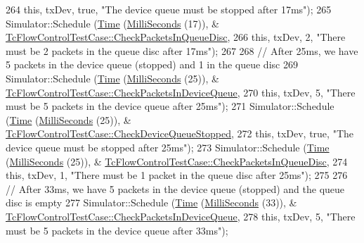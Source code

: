 \begin{DoxyCode}
264                           \textcolor{keyword}{this}, txDev, \textcolor{keyword}{true}, \textcolor{stringliteral}{"The device queue must be stopped after 17ms"});
265       Simulator::Schedule (\hyperlink{classns3_1_1Time}{Time} (\hyperlink{group__timecivil_gaf26127cf4571146b83a92ee18679c7a9}{MilliSeconds} (17)), &
      \hyperlink{classTcFlowControlTestCase_ac6d0b6a74dd29a21369bf1d26795098d}{TcFlowControlTestCase::CheckPacketsInQueueDisc},
266                           \textcolor{keyword}{this}, txDev, 2, \textcolor{stringliteral}{"There must be 2 packets in the queue disc after 17ms"});
267 
268       \textcolor{comment}{// After 25ms, we have 5 packets in the device queue (stopped) and 1 in the queue disc}
269       Simulator::Schedule (\hyperlink{classns3_1_1Time}{Time} (\hyperlink{group__timecivil_gaf26127cf4571146b83a92ee18679c7a9}{MilliSeconds} (25)), &
      \hyperlink{classTcFlowControlTestCase_a7ad467b39fdb155daea4b048619f6d12}{TcFlowControlTestCase::CheckPacketsInDeviceQueue},
270                           \textcolor{keyword}{this}, txDev, 5, \textcolor{stringliteral}{"There must be 5 packets in the device queue after 25ms"});
271       Simulator::Schedule (\hyperlink{classns3_1_1Time}{Time} (\hyperlink{group__timecivil_gaf26127cf4571146b83a92ee18679c7a9}{MilliSeconds} (25)), &
      \hyperlink{classTcFlowControlTestCase_a4ccc9564c9142984fa8041f67b4a518a}{TcFlowControlTestCase::CheckDeviceQueueStopped},
272                           \textcolor{keyword}{this}, txDev, \textcolor{keyword}{true}, \textcolor{stringliteral}{"The device queue must be stopped after 25ms"});
273       Simulator::Schedule (\hyperlink{classns3_1_1Time}{Time} (\hyperlink{group__timecivil_gaf26127cf4571146b83a92ee18679c7a9}{MilliSeconds} (25)), &
      \hyperlink{classTcFlowControlTestCase_ac6d0b6a74dd29a21369bf1d26795098d}{TcFlowControlTestCase::CheckPacketsInQueueDisc},
274                           \textcolor{keyword}{this}, txDev, 1, \textcolor{stringliteral}{"There must be 1 packet in the queue disc after 25ms"});
275 
276       \textcolor{comment}{// After 33ms, we have 5 packets in the device queue (stopped) and the queue disc is empty}
277       Simulator::Schedule (\hyperlink{classns3_1_1Time}{Time} (\hyperlink{group__timecivil_gaf26127cf4571146b83a92ee18679c7a9}{MilliSeconds} (33)), &
      \hyperlink{classTcFlowControlTestCase_a7ad467b39fdb155daea4b048619f6d12}{TcFlowControlTestCase::CheckPacketsInDeviceQueue},
278                           \textcolor{keyword}{this}, txDev, 5, \textcolor{stringliteral}{"There must be 5 packets in the device queue after 33ms"});

\end{DoxyCode}
